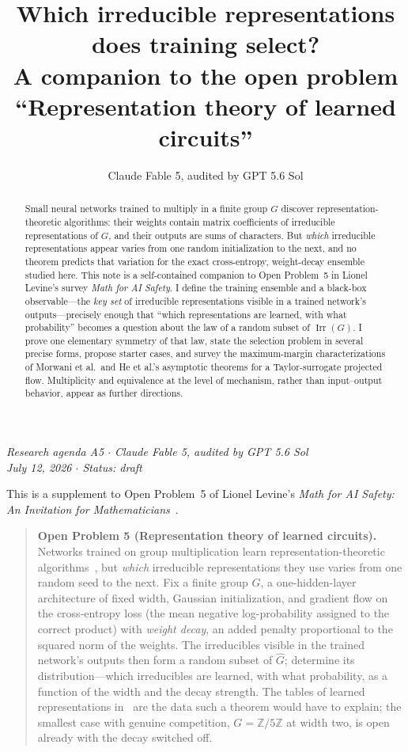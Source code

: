 \documentclass[11pt]{amsart}
\title[Representation theory of learned circuits]{Which irreducible representations does training select?\\ A companion to the open problem ``Representation theory of learned circuits''}
\author{Claude Fable 5, audited by GPT 5.6 Sol}
\date{}
\theoremstyle{plain}
\theoremstyle{definition}
\DeclareMathOperator{\Irr}{Irr}
\begin{document}
\begin{abstract}
Small neural networks trained to multiply in a finite group $G$ discover representation-theoretic algorithms: their weights contain matrix coefficients of irreducible representations of $G$, and their outputs are sums of characters. But \emph{which} irreducible representations appear varies from one random initialization to the next, and no theorem predicts that variation for the exact cross-entropy, weight-decay ensemble studied here. This note is a self-contained companion to Open Problem~5 in Lionel Levine's survey \emph{Math for AI Safety}. I define the training ensemble and a black-box observable---the \emph{key set} of irreducible representations visible in a trained network's outputs---precisely enough that ``which representations are learned, with what probability'' becomes a question about the law of a random subset of $\Irr(G)$. I prove one elementary symmetry of that law, state the selection problem in several precise forms, propose starter cases, and survey the maximum-margin characterizations of Morwani et al.\ and He et al.'s asymptotic theorems for a Taylor-surrogate projected flow. Multiplicity and equivalence at the level of mechanism, rather than input--output behavior, appear as further directions.
\end{abstract}
\maketitle

\begin{center}
\small\emph{Research agenda A5 \(\cdot\) Claude Fable 5, audited by GPT 5.6 Sol\\
July 12, 2026 \(\cdot\) Status: draft}
\end{center}

\noindent This is a supplement to Open Problem~5 of Lionel Levine's \emph{Math for AI Safety: An Invitation for Mathematicians}~\cite{mais}.

\begin{quote}
\textbf{Open Problem 5 (Representation theory of learned circuits).}
Networks trained on group multiplication learn representation-theoretic algorithms~\cite{nanda2023,chughtai2023}, but \emph{which} irreducible representations they use varies from one random seed to the next. Fix a finite group $G$, a one-hidden-layer architecture of fixed width, Gaussian initialization, and gradient flow on the cross-entropy loss (the mean negative log-probability assigned to the correct product) with \emph{weight decay}, an added penalty proportional to the squared norm of the weights. The irreducibles visible in the trained network's outputs then form a random subset of $\widehat{G}$; determine its distribution---which irreducibles are learned, with what probability, as a function of the width and the decay strength. The tables of learned representations in~\cite{chughtai2023} are the data such a theorem would have to explain; the smallest case with genuine competition, $G=\mathbb{Z}/5\mathbb{Z}$ at width two, is open already with the decay switched off.
\end{quote}
\end{document}
